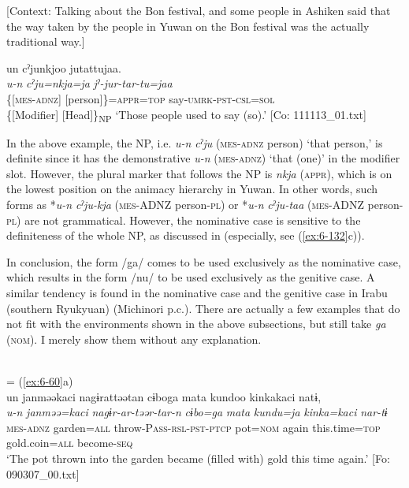 \begin{styleBeschriftung}
\ea\label{ex:6-137}
  [Context: Talking about the Bon festival, and some people in Ashiken said that the way taken by the people in Yuwan on the Bon festival was the actually traditional way.]

{\TM}
\glll un  cˀjunkjoo  jutattujaa.\\
\textit{u-n}  \textit{cˀju=nkja=ja}  \textit{jˀ-jur-tar-tu=jaa}\\
    \{[\textsc{mes}-\textsc{adnz}]  [person]\}=\textsc{appr}=\textsc{top}  say-\textsc{umrk}-\textsc{pst}-\textsc{csl}=\textsc{sol}\\
    \{[Modifier]  [Head]\}\textsubscript{NP}  
\glt    ‘Those people used to say (so).’ [Co: 111113\_01.txt]
\z

In the above example, the NP, i.e. \textit{u-n} \textit{cˀju} (\textsc{mes}-\textsc{adnz} person) ‘that person,’ is definite since it has the demonstrative \textit{u-n} (\textsc{mes}-\textsc{adnz}) ‘that (one)’ in the modifier slot. However, the plural marker that follows the NP is \textit{nkja} (\textsc{appr}), which is on the lowest position on the animacy hierarchy in Yuwan. In other words, such forms as *\textit{u-n} \textit{cˀju-kja} (\textsc{mes}-ADNZ person-\textsc{pl}) or *\textit{u-n} \textit{cˀju-taa} (\textsc{mes}-ADNZ person-\textsc{pl}) are not grammatical. However, the nominative case is sensitive to the definiteness of the whole NP, as discussed in  (especially, see (\ref{ex:6-132}c)).

  In conclusion, the form /ga/ comes to be used exclusively as the nominative case, which results in the form /nu/ to be used exclusively as the genitive case. A similar tendency is found in the nominative case and the genitive case in Irabu (southern Ryukyuan) (Michinori \citealt{Shimoji2013} p.c.). There are actually a few examples that do not fit with the environments shown in the above subsections, but still take \textit{ga} (\textsc{nom}). I merely show them without any explanation.

\ea\label{ex:6-138}
\ea{}\\
\glll = (\ref{ex:6-60}a)\\

{\TM}
\glll un  janməəkaci  nagɨrattəətan  cɨboga   mata  kundoo  kinkakaci  natɨ,\\
      \textit{u-n}  \textit{janməə=kaci}  \textit{nagɨr-ar-təər-tar-n}  \textit{cɨbo=ga}      \textit{mata}  \textit{kundu=ja}  \textit{kinka=kaci}  \textit{nar-tɨ}\\
      \textsc{mes}-\textsc{adnz}  garden=\textsc{all}  throw-P\textsc{ass}-\textsc{rsl}-\textsc{pst}-\textsc{ptcp}  pot=\textsc{nom}      again  this.time=\textsc{top}  gold.coin=\textsc{all}  become-\textsc{seq}\\
\glt ‘The pot thrown into the garden became (filled with) gold this time again.’ [Fo: 090307\_00.txt]
\z


\end{styleBeschriftung}
